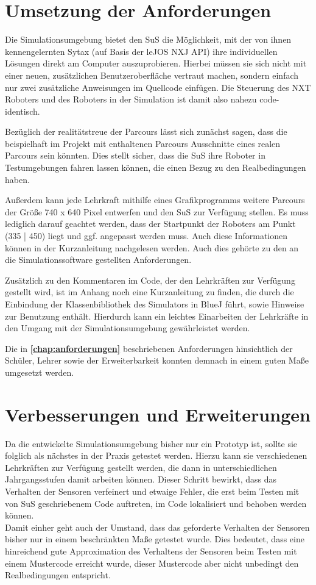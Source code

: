 \documentclass[paper=a4, pagesize, DIV=calc, BCOR=15.5mm, twoside=on, onecolumn=on, open = right, titlepage =on, parskip =half-, headsepline = on, footsepline = on, chapterprefix = on, appendixprefix = off, fontsize = 12pt, numbers = noenddot, abstract = on]{scrbook}
\numberwithin{equation}{chapter}
\theoremstyle{definition}
\theoremstyle{plain}
\theoremstyle{plain}
\theoremstyle{remark}
\theoremstyle{plain}
\theoremstyle{plain}
\begin{document}
\section{Umsetzung der Anforderungen}

Die Simulationsumgebung bietet den SuS die Möglichkeit, mit der von ihnen kennengelernten Sytax (auf Basis der leJOS NXJ API) ihre individuellen Lösungen direkt am Computer auszuprobieren. Hierbei müssen sie sich nicht mit einer neuen, zusätzlichen Benutzeroberfläche vertraut machen, sondern einfach nur zwei zusätzliche Anweisungen im Quellcode einfügen. Die Steuerung des NXT Roboters und des Roboters in der Simulation ist damit also nahezu code-identisch.

Bezüglich der realitätstreue der Parcours lässt sich zunächst sagen, dass die beispielhaft im Projekt mit enthaltenen Parcours Ausschnitte eines realen Parcours sein könnten. Dies stellt sicher, dass die SuS ihre Roboter in Testumgebungen fahren lassen können, die einen Bezug zu den Realbedingungen haben.

Außerdem kann jede Lehrkraft mithilfe eines Grafikprogramms weitere Parcours der Größe 740 x 640 Pixel entwerfen und den SuS zur Verfügung stellen. Es muss lediglich darauf geachtet werden, dass der Startpunkt der Roboters am Punkt (335 | 450) liegt und ggf. angepasst werden muss. Auch diese Informationen können in der Kurzanleitung nachgelesen werden. Auch dies gehörte zu den an die Simulationssoftware gestellten Anforderungen.

Zusätzlich zu den Kommentaren im Code, der den Lehrkräften zur Verfügung gestellt wird, ist im Anhang noch eine Kurzanleitung zu finden, die durch die Einbindung der Klassenbibliothek des Simulators in BlueJ führt, sowie Hinweise zur Benutzung enthält. Hierdurch kann ein leichtes Einarbeiten der Lehrkräfte in den Umgang mit der Simulationsumgebung gewährleistet werden. 

Die in \textbf{\ref{chap:anforderungen}} beschriebenen Anforderungen hinsichtlich der Schüler, Lehrer sowie der Erweiterbarkeit konnten demnach in einem guten Maße umgesetzt werden.

\section{Verbesserungen und Erweiterungen}

Da die entwickelte Simulationsumgebung bisher nur ein Prototyp ist, sollte sie folglich als nächstes in der Praxis getestet werden. Hierzu kann sie verschiedenen Lehrkräften zur Verfügung gestellt werden, die dann in unterschiedlichen Jahrgangsstufen damit arbeiten können. Dieser Schritt bewirkt, dass das Verhalten der Sensoren verfeinert und etwaige Fehler, die erst beim Testen mit von SuS geschriebenem Code auftreten, im Code lokalisiert und behoben werden können.\\
Damit einher geht auch der Umstand, dass das geforderte Verhalten der Sensoren bisher nur in einem beschränkten Maße getestet wurde. Dies bedeutet, dass eine hinreichend gute Approximation des Verhaltens der Sensoren beim Testen mit einem Mustercode erreicht wurde, dieser Mustercode aber nicht unbedingt den Realbedingungen entspricht. 
\end{document}
